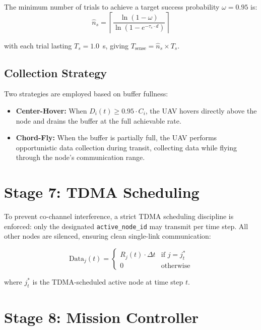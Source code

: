 \documentclass[12pt, a4paper, oneside]{report}
\begin{document}
The minimum number of trials to achieve a target success probability $\omega = 0.95$ is:
\begin{equation}
\hat{n}_s = \left\lceil \frac{\ln(1 - \omega)}{\ln(1 - e^{-\tau_s \cdot d})} \right\rceil
\label{eq:min_trials}
\end{equation}

with each trial lasting $T_s = 1.0$~s, giving $T_{\text{sense}} = \hat{n}_s \times T_s$.

\subsection{Collection Strategy}

Two strategies are employed based on buffer fullness:
\begin{itemize}
    \item \textbf{Center-Hover:} When $D_i(t) \geq 0.95 \cdot C_i$, the UAV hovers directly above the node and drains the buffer at the full achievable rate.
    \item \textbf{Chord-Fly:} When the buffer is partially full, the UAV performs opportunistic data collection during transit, collecting data while flying through the node's communication range.
\end{itemize}

\section{Stage 7: TDMA Scheduling}
\label{sec:tdma}

To prevent co-channel interference, a strict TDMA scheduling discipline is enforced: only the designated \texttt{active\_node\_id} may transmit per time step. All other nodes are silenced, ensuring clean single-link communication:

\begin{equation}
\text{Data}_j(t) =
\begin{cases}
R_j(t) \cdot \Delta t & \text{if } j = j^*_t \\
0 & \text{otherwise}
\end{cases}
\label{eq:tdma}
\end{equation}

where $j^*_t$ is the TDMA-scheduled active node at time step $t$.

\section{Stage 8: Mission Controller}
\label{sec:mission_controller}
\end{document}
